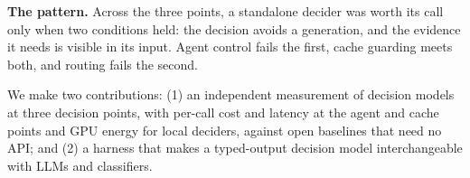 \textbf{The pattern.}
Across the three points, a standalone decider was worth its call only when two conditions held: the decision avoids a generation, and the evidence it needs is visible in its input.
Agent control fails the first, cache guarding meets both, and routing fails the second.

We make two contributions:
(1) an independent measurement of decision models at three decision points, with per-call cost and latency at the agent and cache points and GPU energy for local deciders, against open baselines that need no API; and
(2) a harness that makes a typed-output decision model interchangeable with LLMs and classifiers.

